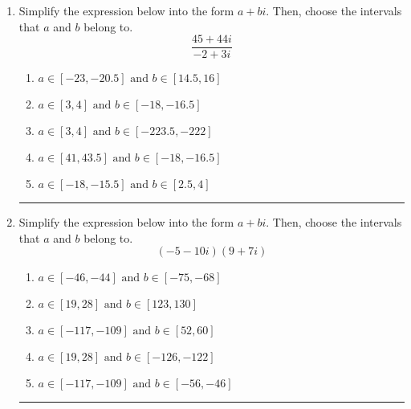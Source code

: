 \documentclass[14pt]{extbook}
\newcommand{\litem}[1]{\item#1\hspace*{-1cm}\rule{\textwidth}{0.4pt}}
\begin{document}
\begin{enumerate}
{\begin{enumerate}[label=\Alph*.]
\end{enumerate} }
\litem{
Simplify the expression below into the form $a+bi$. Then, choose the intervals that $a$ and $b$ belong to.\[ \frac{45 + 44 i}{-2 + 3 i} \]\begin{enumerate}[label=\Alph*.]
\item \( a \in [-23, -20.5] \text{ and } b \in [14.5, 16] \)
\item \( a \in [3, 4] \text{ and } b \in [-18, -16.5] \)
\item \( a \in [3, 4] \text{ and } b \in [-223.5, -222] \)
\item \( a \in [41, 43.5] \text{ and } b \in [-18, -16.5] \)
\item \( a \in [-18, -15.5] \text{ and } b \in [2.5, 4] \)

\end{enumerate} }
\litem{
Simplify the expression below into the form $a+bi$. Then, choose the intervals that $a$ and $b$ belong to.\[ (-5 - 10 i)(9 + 7 i) \]\begin{enumerate}[label=\Alph*.]
\item \( a \in [-46, -44] \text{ and } b \in [-75, -68] \)
\item \( a \in [19, 28] \text{ and } b \in [123, 130] \)
\item \( a \in [-117, -109] \text{ and } b \in [52, 60] \)
\item \( a \in [19, 28] \text{ and } b \in [-126, -122] \)
\item \( a \in [-117, -109] \text{ and } b \in [-56, -46] \)

\end{enumerate} }
\end{enumerate}
\end{document}
